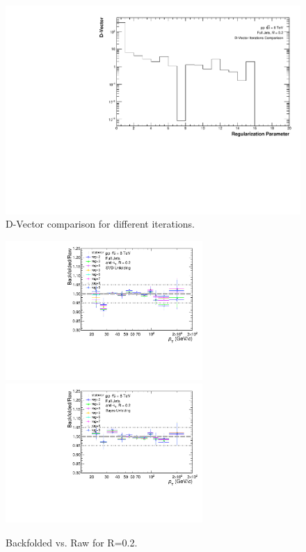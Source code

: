 \documentclass[ALICE]{ALICE_analysis_notes}
\begin{document}
\begin{figure}
    \centering
    \includegraphics[width=15cm]{figures/DVector/DVector_R02.pdf}
    \caption{D-Vector comparison for different iterations.}
    \label{fig:DVector}
\end{figure}

\begin{figure}
    \centering
    \begin{multicols}{2}
        \includegraphics[width=7.5cm]{figures/UnfoldingComparisons/BackfoldedVsRaw/RatioFoldRawSvd_R02.pdf}
    \vfill\null
    \columnbreak
        \includegraphics[width=7.5cm]{figures/UnfoldingComparisons/BackfoldedVsRaw/RatioFoldRawBayes_R02.pdf}
        \vfill\null
    \end{multicols}
    \caption{Backfolded vs. Raw for R=0.2.}
    \label{fig:BackfoldedRaw}
\end{figure}
\end{document}
